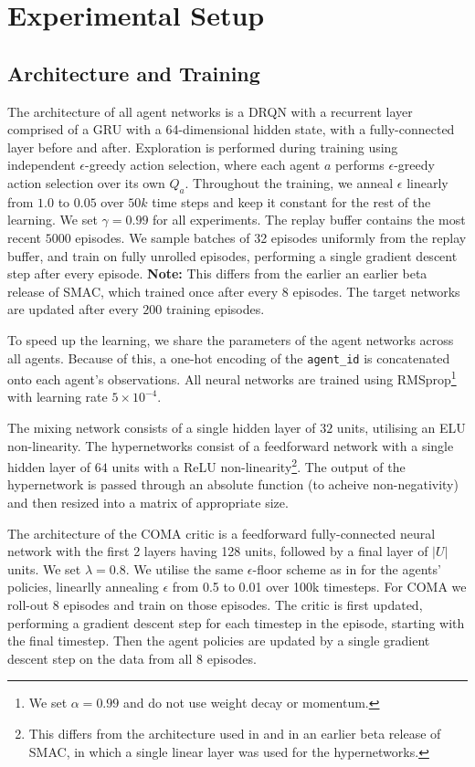 \section{Experimental Setup}\label{appendix:exp_setup}

\subsection{Architecture and Training}

The architecture of all agent networks is a DRQN\cite{hausknecht_deep_2015} with a recurrent layer 
comprised of a GRU with a 64-dimensional hidden state, with a fully-connected 
layer before and after.
Exploration is performed during training using independent $\epsilon$-greedy action selection, where each agent $a$ performs $\epsilon$-greedy action selection over its own $Q_a$. 
Throughout the training, we anneal $\epsilon$ linearly from $1.0$ to $0.05$ over $50k$ time steps and keep it constant for the rest of the learning. 
We set $\gamma = 0.99$ for all experiments.
The replay buffer contains the most recent $5000$ episodes.  
We sample batches of 32 episodes uniformly from the replay buffer, and train on fully unrolled episodes, performing a single gradient descent step after every episode. 
\textbf{Note:} This differs from the earlier an earlier beta release of SMAC, which trained once after every 8 episodes.
The target networks are updated after every $200$ training episodes.

To speed up the learning, we share the parameters of the agent networks across all agents. 
Because of this, a one-hot encoding of the \texttt{agent\_id} is concatenated onto each agent's observations. 
All neural networks are trained using RMSprop\footnote{We set $\alpha = 0.99$ and do not use weight decay or momentum.} with learning rate $5 \times 10^{-4}$. 

The mixing network consists of a single hidden layer of $32$ units, utilising an ELU non-linearity. 
The hypernetworks consist of a feedforward network with a single hidden layer of $64$ units with a ReLU non-linearity\footnote{This differs from the architecture used in \citep{rashid_qmix:_2018} and in an earlier beta release of SMAC, in which a single linear layer was used for the hypernetworks.}. 
The output of the hypernetwork is passed through an absolute function (to acheive non-negativity) and then resized into a matrix of appropriate size.

The architecture of the COMA critic is a feedforward fully-connected neural network with the first 2 layers having 128 units, followed by a final layer of $|U|$ units. We set $\lambda=0.8$. 
We utilise the same $\epsilon$-floor scheme as in \citep{foerster_counterfactual_2017} for the agents’ policies, linearlly annealing $\epsilon$ from 0.5 to 0.01 over 100k timesteps.
For COMA we roll-out 8 episodes and train on those episodes.
The critic is first updated, performing a gradient descent step for each timestep in the episode, starting with the final timestep.
Then the agent policies are updated by a single gradient descent step on the data from all 8 episodes.

